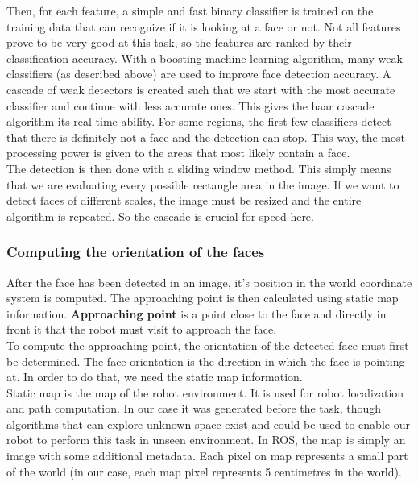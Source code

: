 \documentclass[12pt,a4paper]{article}
\begin{document}
	Then, for each feature, a simple and fast binary classifier is trained on the training data that can recognize if it is looking at a face or not. Not all features prove to be very good at this task, so the features are ranked by their classification accuracy. With a boosting machine learning algorithm, many weak classifiers (as described above) are used to improve face detection accuracy. A cascade of weak detectors is created such that we start with the most accurate classifier and continue with less accurate ones. This gives the haar cascade algorithm its real-time ability. For some regions, the first few classifiers detect that there is definitely not a face and the detection can stop. This way, the most processing power is given to the areas that most likely contain a face. \\
	
	The detection is then done with a sliding window method. This simply means that we are evaluating every possible rectangle area in the image. If we want to detect faces of different scales, the image must be resized and the entire algorithm is repeated. So the cascade is crucial for speed here. \\
	
	\subsubsection{Computing the orientation of the faces} \label{face_orientation_computation}
	After the face has been detected in an image, it's position in the world coordinate system is computed. The approaching point is then calculated using static map information. \textbf{Approaching point} is a point close to the face and directly in front it that the robot must visit to approach the face. \\
	
	To compute the approaching point, the orientation of the detected face must first be determined. The face orientation is the direction in which the face is pointing at. In order to do that, we need the static map information. \\
	
	Static map is the map of the robot environment. It is used for robot localization and path computation. In our case it was generated before the task, though algorithms that can explore unknown space exist and could be used to enable our robot to perform this task in unseen environment. In ROS, the map is simply an image with some additional metadata. Each pixel on map represents a small part of the world (in our case, each map pixel represents 5 centimetres in the world).\\
	
\end{document}
